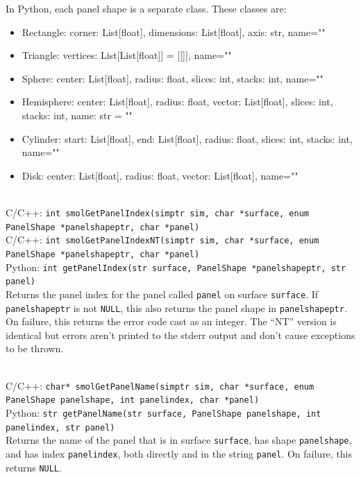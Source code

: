 \documentclass {scrbook}
\newcommand {\ttt} {\texttt}
\begin{document}
\begin{description}
In Python, each panel shape is a separate class. These classes are:
\begin{itemize}
\item Rectangle: corner: List[float], dimensions: List[float], axis: str, name=""
\item Triangle: vertices: List[List[float]] = [[]], name=""
\item Sphere: center: List[float], radius: float, slices: int, stacks: int, name=""
\item Hemisphere: center: List[float], radius: float, vector: List[float], slices: int, stacks: int, name: str = ""
\item Cylinder: start: List[float], end: List[float], radius: float, slices: int, stacks: int, name=""
\item Disk: center: List[float], radius: float, vector: List[float], name=""
\end{itemize}

\item[GetPanelIndex]
\hfill \\
C/C++: \ttt{int smolGetPanelIndex(simptr sim, char *surface, enum PanelShape *panelshapeptr, char *panel)}\\
C/C++: \ttt{int smolGetPanelIndexNT(simptr sim, char *surface, enum PanelShape *panelshapeptr, char *panel)}\\
Python: \ttt{int getPanelIndex(str surface, PanelShape *panelshapeptr, str panel)}\\
Returns the panel index for the panel called \ttt{panel} on surface \ttt{surface}. If \ttt{panelshapeptr} is not \ttt{NULL}, this also returns the panel shape in \ttt{panelshapeptr}. On failure, this returns the error code cast as an integer. The ``NT'' version is identical but errors aren't printed to the stderr output and don't cause exceptions to be thrown.

\item[GetPanelName]
\hfill \\
C/C++: \ttt{char* smolGetPanelName(simptr sim, char *surface, enum PanelShape panelshape, int panelindex, char *panel)}\\
Python: \ttt{str getPanelName(str surface, PanelShape panelshape, int panelindex, str panel)}\\
Returns the name of the panel that is in surface \ttt{surface}, has shape \ttt{panelshape}, and has index \ttt{panelindex}, both directly and in the string \ttt{panel}. On failure, this returns \ttt{NULL}.


\end{description}
\end{document}
